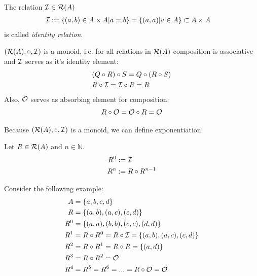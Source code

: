\begin{definition}
The relation $\mathcal{I} \in \mathcal{R}(A)$
\begin{align}
\mathcal{I} &:= \{ (a,b) \in A \times A | a = b \} = \{ (a,a) | a \in A \} \subset A \times A
\end{align}
is called \emph{identity relation}.
\end{definition}

$(\mathcal{R}(A),\circ,\mathcal{I})$ is a monoid, i.e. for all relations in $\mathcal{R}(A)$ composition is associative and $\mathcal{I}$ serves as it's identity element:
\begin{align}
&(Q \circ R) \circ S 
= Q \circ (R \circ S)
\\
&R \circ \mathcal{I} 
= \mathcal{I} \circ R = R
\end{align}
Also, $\mathcal{O}$ serves as absorbing element for composition:
\begin{align}
R \circ \mathcal{O} = \mathcal{O} \circ R = \mathcal{O}
\end{align}

Because $(\mathcal{R}(A),\circ,\mathcal{I})$ is a monoid, we can define exponentiation:

\begin{definition}
Let $R \in \mathcal{R}(A)$ and $n \in \mathbb{N}$.
\begin{align}
R^{0} &:= \mathcal{I}
\\R^{n} &:= R \circ R^{n-1}
\end{align}
\end{definition}

Consider the following example:
\begin{align}
A &= \{a,b,c,d\}\\
R &= \{(a,b),(a,c),(c,d)\}\\
R^{0} &= \{(a,a),(b,b),(c,c),(d,d)\}\\
R^{1} &= R \circ R^{0} = R \circ \mathcal{I} = \{(a,b),(a,c),(c,d) \}\\
R^{2} &= R \circ R^{1} = R \circ R = \{(a,d)\}\\
R^{3} &= R \circ R^{2} = \mathcal{O}\\
R^{4} &= R^{5} = R^{6} = ... = R \circ \mathcal{O} = \mathcal{O}
\end{align}


